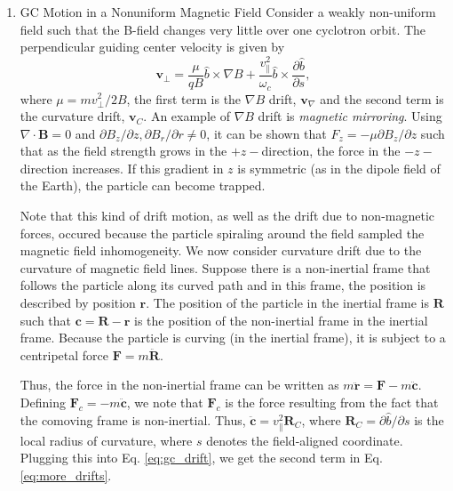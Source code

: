 \begin{enumerate}
		\item{GC Motion in a Nonuniform Magnetic Field} 
		Consider a weakly non-uniform field such that the B-field changes very little over one cyclotron orbit. The perpendicular guiding center velocity is given by
		\begin{equation}
			\label{eq:more_drifts}
			\mathbf{v}_{\perp} = \frac{\mu}{qB}\hat{b}\times\nabla B +  \frac{v_{\parallel}^2}{\omega_c}\hat{b}\times \frac{\partial \hat{b}}{\partial s},
		\end{equation}
		where $\mu=mv_{\perp}^2/2B$, the first term is the $\nabla B$ drift, $\mathbf{v}_{\nabla}$ and the second term is the curvature drift, $\mathbf{v}_C$. An example of $\nabla B$ drift is \textit{magnetic mirroring}. Using $\nabla\cdot\mathbf{B}=0$ and $\partial B_z/\partial z,\partial B_r/\partial r\neq0$, it can be shown that $F_z=-\mu\partial B_z/\partial z$ such that as the field strength grows in the $+z-$direction, the force in the $-z-$direction increases. If this gradient in $z$ is symmetric (as in the dipole field of the Earth), the particle can become trapped.

		Note that this kind of drift motion, as well as the drift due to non-magnetic forces, occured because the particle spiraling around the field sampled the magnetic field inhomogeneity. We now consider curvature drift due to the curvature of magnetic field lines. Suppose there is a non-inertial frame that follows the particle along its curved path and in this frame, the position is described by position $\mathbf{r}$. The position of the particle in the inertial frame is $\mathbf{R}$ such that $\mathbf{c}=\mathbf{R}-\mathbf{r}$ is the position of the non-inertial frame in the inertial frame. Because the particle is curving (in the inertial frame), it is subject to a centripetal force $\mathbf{F}=m\ddot{\mathbf{R}}$.

		Thus, the force in the non-inertial frame can be written as $m\ddot{\mathbf{r}}=\mathbf{F} - m\ddot{\mathbf{c}}$. Defining $\mathbf{F}_c=-m\ddot{\mathbf{c}}$, we note that $\mathbf{F}_c$ is the force resulting from the fact that the comoving frame is non-inertial. Thus, $\ddot{\mathbf{c}}=v_{\parallel}^2\mathbf{R}_C$, where $\mathbf{R}_C=\partial\hat{b}/\partial s$ is the local radius of curvature, where $s$ denotes the field-aligned coordinate. Plugging this into Eq. \ref{eq:gc_drift}, we get the second term in Eq. \ref{eq:more_drifts}.

	\end{enumerate}
	
